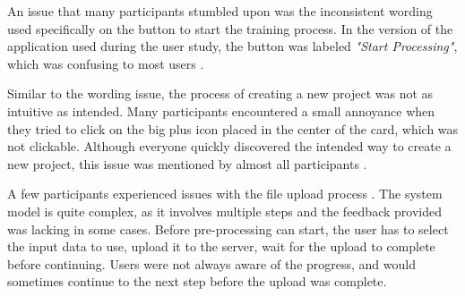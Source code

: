 
\label{sec:results:issues:inconsistent_wording}
An issue that many participants stumbled upon was the inconsistent wording used specifically on the button to start the training process.
In the version of the application used during the user study, the button was labeled \emph{"Start Processing"}, which was confusing to most users \cite{P2, P3, P6, P7, P8}.


Similar to the wording issue, the process of creating a new project was not as intuitive as intended.
Many participants encountered a small annoyance when they tried to click on the big plus icon placed in the center of the card, which was not clickable. 
Although everyone quickly discovered the intended way to create a new project, this issue was mentioned by almost all participants \cite{P3, P4, P5, P6, P7, P8}.


\label{sec:results:issues:file_upload}
A few participants experienced issues with the file upload process \cite{P1, P4, P6}.
The system model is quite complex, as it involves multiple steps and the feedback provided was lacking in some cases.
Before pre-processing can start, the user has to select the input data to use, upload it to the server, wait for the upload to complete before continuing.
Users were not always aware of the progress, and would sometimes continue to the next step before the upload was complete. 

